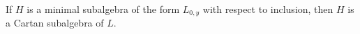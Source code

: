 If $H$ is a minimal subalgebra of the form $L_{0, y}$ with respect to inclusion,
then $H$ is a Cartan subalgebra of $L$.
